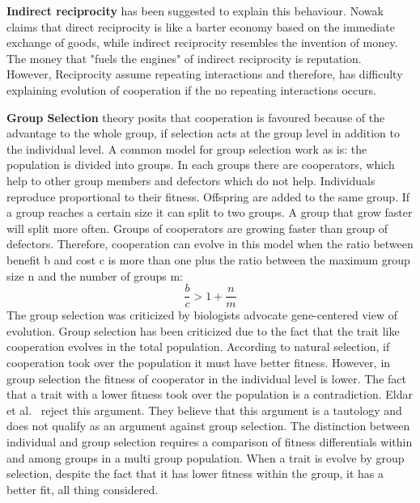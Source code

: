 \documentclass{article}
\begin{document}
\textbf{Indirect reciprocity} has been suggested to explain this behaviour. 
Nowak~\cite{nowak2006five} claims that direct reciprocity is like a barter economy based on the immediate exchange of goods, while indirect reciprocity resembles the invention of money. The money that "fuels the engines" of indirect reciprocity is reputation. 
\\However, Reciprocity assume repeating interactions and therefore, has difficulty explaining evolution of cooperation if the no repeating interactions occurs. 

\textbf{Group Selection} theory posits that cooperation is favoured because of the advantage to the whole group, if selection acts at the group level in addition to the individual level. A common model for group selection work as is: the population is divided into groups. In each groups there are cooperators, which help to other group members and defectors which do not help. 
Individuals reproduce proportional to their fitness. Offspring are added to the same group.
If a group reaches a certain size it can split to two groups. A group that grow faster will split more often. Groups of cooperators are growing faster than group of defectors.
Therefore, cooperation can evolve in this model when the ratio between benefit b and cost c is more than one plus the ratio between the maximum group size n and the number of groups m:
\begin{equation} \label{groupselection}
\frac{b}{c}>1+\frac{n}{m}
\end{equation}
The group selection was criticized by biologists advocate gene-centered view of evolution. Group selection has been criticized due to the fact that the trait like cooperation evolves in the total population. According to natural selection, if cooperation took over the population it must have better fitness. However, in group selection the fitness of cooperator in the individual level is lower. The fact that a trait with a lower fitness took over the population is a contradiction. Eldar et al.~\cite{eldakar2011eight} reject this argument. They believe that this argument is a tautology and does not qualify as an argument against group selection. The distinction between individual and group selection requires a comparison of fitness differentials within and among groups in a multi group population. When a trait is evolve by group selection, despite the fact that it has lower fitness within the group, it has a better fit, all thing considered. 
\end{document}
